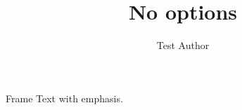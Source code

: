 \documentclass[aspectratio=169,10pt]{beamer}
\title{No options}
\author{Test Author}
\begin{document}
\maketitle
\begin{frame}{Frame}
	Text with \alert{emphasis}.
\end{frame}
\end{document}
